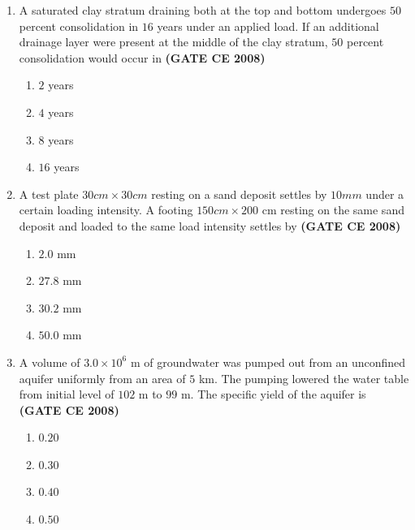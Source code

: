 \documentclass[journal]{IEEEtran}
\begin{document}
\begin{enumerate}
\item A saturated clay stratum draining both at the top and bottom undergoes $50$ percent consolidation in $16$ years under an applied load. If an additional drainage layer were present at the middle of the clay stratum, $50$ percent consolidation would occur in \textbf{(GATE CE 2008)}

\begin{multicols}{2}

\begin{enumerate}
\item $2$  years
\item $4$  years
\item $8$  years
\item $16$ years
\end{enumerate}     
\end{multicols}

\item A test plate $30 cm \times 30 cm$ resting on a sand deposit settles by $10 mm$ under a certain loading intensity. A footing $150 cm \times 200$ cm resting on the same sand deposit and loaded to the same load intensity settles by \textbf{(GATE CE 2008)}

\begin{multicols}{2}

\begin{enumerate}
\item $2.0$ mm
\item $27.8$ mm
\item $30.2$ mm
\item $50.0$ mm
\end{enumerate}     
\end{multicols}

\item A volume of $3.0 \times 10^{6}$ m of groundwater was pumped out from an unconfined aquifer uniformly from an area of $5$ km. The pumping lowered the water table from initial level of $102$ m to $99$ m. The specific yield of the aquifer is \textbf{(GATE CE 2008)}

\begin{multicols}{2}

\begin{enumerate}
\item $0.20$ 
\item $0.30$ 
\item $0.40$ 
\item $0.50$ 
\end{enumerate}     
\end{multicols}


\end{enumerate}
\end{document}
